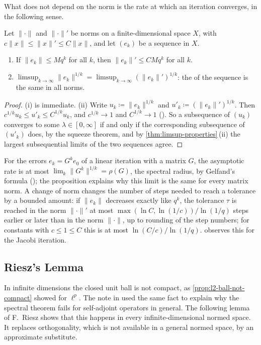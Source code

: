 What does not depend on the norm is the rate at which an iteration converges, in the following sense.

\begin{proposition}
\label{prop:rate-norm-independent}
Let $\|\cdot\|$ and $\|\cdot\|'$ be norms on a finite-dimensional space $X$, with $c\|x\|\le\|x\|'\le C\|x\|$, and let $(e_k)$ be a sequence in $X$.
\begin{enumerate}
\item If $\|e_k\|\le Mq^k$ for all $k$, then $\|e_k\|'\le CMq^k$ for all $k$.
\item $\limsup_{k\to\infty}\|e_k\|^{1/k}=\limsup_{k\to\infty}(\|e_k\|')^{1/k}$: the  of the sequence is the same in all norms.
\end{enumerate}
\end{proposition}

\begin{proof}
(i) is immediate. (ii) Write $u_k\coloneqq\|e_k\|^{1/k}$ and $u'_k\coloneqq(\|e_k\|')^{1/k}$. Then $c^{1/k}u_k\le u'_k\le C^{1/k}u_k$, and $c^{1/k}\to1$ and $C^{1/k}\to1$ (). So a subsequence of $(u_k)$ converges to some $\lambda\in[0,\infty]$ if and only if the corresponding subsequence of $(u'_k)$ does, by the squeeze theorem, and by \cref{thm:limsup-properties}\,(ii) the largest subsequential limits of the two sequences agree.
\end{proof}

For the errors $e_k=G^k e_0$ of a linear iteration with a matrix $G$, the asymptotic rate is at most $\lim_k\|G^k\|^{1/k}=\rho(G)$, the spectral radius, by Gelfand's formula (); the proposition explains why this limit is the same for every matrix norm. A change of norm changes the number of steps needed to reach a tolerance by a bounded amount: if $\|e_k\|$ decreases exactly like $q^k$, the tolerance $\tau$ is reached in the norm $\|\cdot\|'$ at most $\max(\ln C,\ln(1/c))/\ln(1/q)$ steps earlier or later than in the norm $\|\cdot\|$, up to rounding of the step numbers; for constants with $c\le1\le C$ this is at most $\ln(C/c)/\ln(1/q)$.  observes this for the Jacobi iteration.

\subsection{Riesz's Lemma}

In infinite dimensions the closed unit ball is not compact, as \cref{prop:l2-ball-not-compact} showed for $\ell^p$. The note in  used the same fact to explain why the spectral theorem fails for self-adjoint operators in general. The following lemma of F.~Riesz shows that this happens in every infinite-dimensional normed space. It replaces orthogonality, which is not available in a general normed space, by an approximate substitute.

